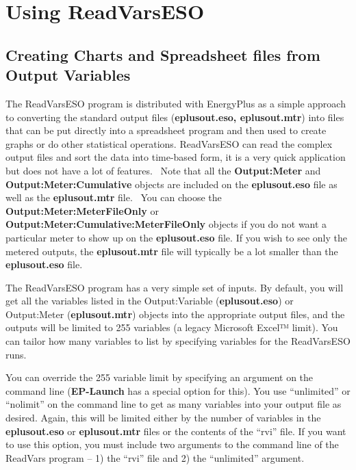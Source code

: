 \section{Using ReadVarsESO}\label{using-readvarseso}

\subsection{Creating Charts and Spreadsheet files from Output Variables}\label{creating-charts-and-spreadsheet-files-from-output-variables}

The ReadVarsESO program is distributed with EnergyPlus as a simple approach to converting the standard output files (\textbf{eplusout.eso, eplusout.mtr}) into files that can be put directly into a spreadsheet program and then used to create graphs or do other statistical operations. ReadVarsESO can read the complex output files and sort the data into time-based form, it is a very quick application but does not have a lot of features.~ Note that all the \textbf{Output:Meter} and \textbf{Output:Meter:Cumulative} objects are included on the \textbf{eplusout.eso} file as well as the \textbf{eplusout.mtr} file.~ You can choose the \textbf{Output:Meter:MeterFileOnly} or \textbf{Output:Meter:Cumulative:MeterFileOnly} objects if you do not want a particular meter to show up on the \textbf{eplusout.eso} file. If you wish to see only the metered outputs, the \textbf{eplusout.mtr} file will typically be a lot smaller than the \textbf{eplusout.eso} file.

The ReadVarsESO program has a very simple set of inputs. By default, you will get all the variables listed in the Output:Variable (\textbf{eplusout.eso}) or Output:Meter (\textbf{eplusout.mtr}) objects into the appropriate output files, and the outputs will be limited to 255 variables (a legacy Microsoft Excel™ limit). You can tailor how many variables to list by specifying variables for the ReadVarsESO runs.

You can override the 255 variable limit by specifying an argument on the command line (\textbf{EP-Launch} has a special option for this). You use ``unlimited'' or ``nolimit'' on the command line to get as many variables into your output file as desired. Again, this will be limited either by the number of variables in the \textbf{eplusout.eso} or \textbf{eplusout.mtr} files or the contents of the ``rvi'' file. If you want to use this option, you must include two arguments to the command line of the ReadVars program -- 1) the ``rvi'' file and 2) the ``unlimited'' argument.

